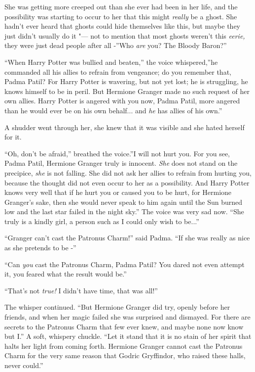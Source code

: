 She was getting more creeped out than she ever had been in her life, and
the possibility was starting to occur to her that this might
\emph{really} be a ghost. She hadn't ever heard that ghosts could hide
themselves like this, but maybe they just didn't usually do it "--- not to
mention that most ghosts weren't this \emph{eerie,} they were just dead
people after all -''Who \emph{are} you? The Bloody Baron?''

``When Harry Potter was bullied and beaten,'' the voice whispered,''he
commanded all his allies to refrain from vengeance; do you remember
that, Padma Patil? For Harry Potter is wavering, but not yet lost; he is
struggling, he knows himself to be in peril. But Hermione Granger made
no such request of her own allies. Harry Potter is angered with you now,
Padma Patil, more angered than he would ever be on his own
behalf... and \emph{he} has allies of his own.''

A shudder went through her, she knew that it was visible and she hated
herself for it.

``Oh, don't be afraid,'' breathed the voice.''I will not hurt you. For
you see, Padma Patil, Hermione Granger truly is innocent. \emph{She}
does not stand on the precipice, \emph{she} is not falling. She did not
ask her allies to refrain from hurting you, because the thought did not
even occur to her as a possibility. And Harry Potter knows very well
that if he hurt you or caused you to be hurt, for Hermione Granger's
sake, then she would never speak to him again until the Sun burned low
and the last star failed in the night sky.'' The voice was very sad now.
``She truly is a kindly girl, a person such as I could only wish to
be...''

``Granger can't cast the Patronus Charm!'' said Padma. ``If she was
really as nice as she pretends to be -''

``Can \emph{you} cast the Patronus Charm, Padma Patil? You dared not even
attempt it, you feared what the result would be.''

``That's not \emph{true!} I didn't have time, that was all!''

The whisper continued. ``But Hermione Granger did try, openly before her
friends, and when her magic failed she was surprised and dismayed. For
there are secrets to the Patronus Charm that few ever knew, and maybe
none now know but I.'' A soft, whispery chuckle. ``Let it stand that it
is no stain of her spirit that halts her light from coming forth.
Hermione Granger cannot cast the Patronus Charm for the very same reason
that Godric Gryffindor, who raised these halls, never could.''

